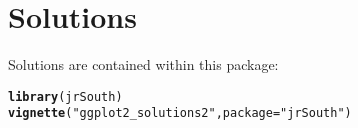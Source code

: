 \documentclass[a4paper,justified,openany]{tufte-handout}\usepackage[]{graphicx}\usepackage[]{color}
\makeatletter
\newcommand{\hlstr}[1]{\textcolor[rgb]{0.2,0.2,0.2}{#1}}%
\newcommand{\hlstd}[1]{\textcolor[rgb]{0.102,0.102,0.102}{#1}}%
\newcommand{\hlkwc}[1]{\textcolor[rgb]{0.2,0.2,0.2}{#1}}%
\newcommand{\hlkwd}[1]{\textcolor[rgb]{0.102,0.102,0.102}{\textbf{#1}}}%
\newenvironment{kframe}{%
 \def\at@end@of@kframe{}%
 \ifinner\ifhmode%
  \def\at@end@of@kframe{\end{minipage}}%
  \begin{minipage}{\columnwidth}%
 \fi\fi%
 \def\FrameCommand##1{\hskip\@totalleftmargin \hskip-\fboxsep
 \colorbox{shadecolor}{##1}\hskip-\fboxsep
     \hskip-\linewidth \hskip-\@totalleftmargin \hskip\columnwidth}%
 \MakeFramed {\advance\hsize-\width
   \@totalleftmargin\z@ \linewidth\hsize
   \@setminipage}}%
 {\par\unskip\endMakeFramed%
 \at@end@of@kframe}
\newenvironment{knitrout}{}{} %
\makeatother
\begin{document}
\section*{Solutions}

Solutions are contained within this package:
\begin{knitrout}
\color{fgcolor}\begin{kframe}
\begin{alltt}
\hlkwd{library}\hlstd{(jrSouth)}
\hlkwd{vignette}\hlstd{(}\hlstr{"ggplot2_solutions2"}\hlstd{,} \hlkwc{package}\hlstd{=}\hlstr{"jrSouth"}\hlstd{)}
\end{alltt}
\end{kframe}
\end{knitrout}
\end{document}
